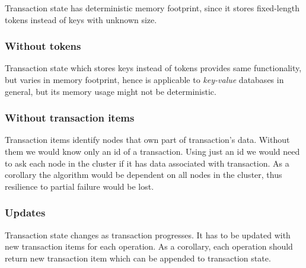  

Transaction state has deterministic memory footprint, since it stores fixed-length tokens instead of keys with unknown size.

\subsubsection{Without tokens}
Transaction state which stores keys instead of tokens provides same functionality, but varies in memory footprint, hence \mpt is applicable to \emph{key-value} databases in general, but its memory usage might not be deterministic.

\subsubsection{Without transaction items}
Transaction items identify nodes that own part of transaction's data. Without them we would know only an id of a transaction.
Using just an id we would need to ask each node in the cluster if it has data associated with transaction. As a corollary the algorithm would be dependent on all nodes in the cluster, thus resilience to partial failure would be lost.

\subsubsection{Updates}
Transaction state changes as transaction progresses. It has to be updated with new transaction items for each operation. As a corollary, each operation should return new transaction item which can be appended to transaction state. 



